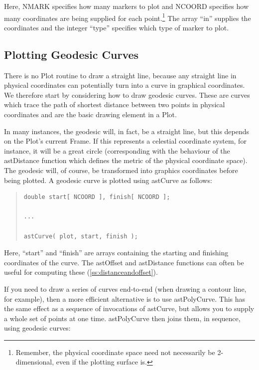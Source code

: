 \documentclass[twoside,11pt]{article}
\newcommand{\htmlref}[2]{#1}
\newcommand{\secref}[1]{\S\ref{#1}}
\renewcommand{\secref}[1]{\ref{#1}}
\begin{document}
Here, NMARK specifies how many markers to plot and NCOORD specifies
how many coordinates are being supplied for each
point.\footnote{Remember, the physical coordinate space need not
necessarily be 2-dimensional, even if the plotting surface is.} The
array ``in'' supplies the coordinates and the integer ``type''
specifies which type of marker to plot.

\subsection{\label{ss:plottinggeodesics}Plotting Geodesic Curves}

There is no \htmlref{Plot}{Plot} routine to draw a straight line, because any straight
line in physical coordinates can potentially turn into a curve in
graphical coordinates. We therefore start by considering how to draw
geodesic curves.  These are curves which trace the path of shortest
distance between two points in physical coordinates
 and are the basic drawing element in a Plot. 

In many instances, the geodesic will, in fact, be a straight line, but
this depends on the Plot's current \htmlref{Frame}{Frame}. If this represents a
celestial coordinate system, for instance, it will be a great circle
(corresponding with the behaviour of the \htmlref{astDistance}{astDistance} function which
defines the metric of the physical coordinate space).  The geodesic
will, of course, be transformed into graphics coordinates before being
plotted. A geodesic curve is plotted using \htmlref{astCurve}{astCurve} as follows:

\begin{quote}
\small
\begin{verbatim}
double start[ NCOORD ], finish[ NCOORD ];

...

astCurve( plot, start, finish );
\end{verbatim}
\normalsize
\end{quote}

Here, ``start'' and ``finish'' are arrays containing the starting and
finishing coordinates of the curve. The \htmlref{astOffset}{astOffset} and astDistance
functions can often be useful for computing these
(\secref{ss:distanceandoffset}).

If you need to draw a series of curves end-to-end (when drawing a
contour line, for example), then a more efficient alternative is to
use \htmlref{astPolyCurve}{astPolyCurve}. This has the same effect as a sequence of
invocations of astCurve, but allows you to supply a whole set of
points at one time. astPolyCurve then joins them, in sequence, using
geodesic curves:
\end{document}
